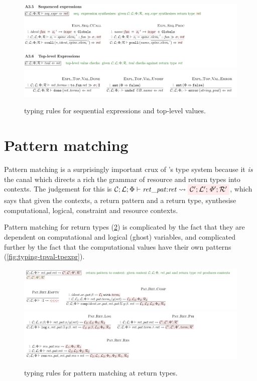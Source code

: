 \begin{figure}[tp]
    \includegraphics{figures/kernel-seq-expr-typing}
    \includegraphics{figures/kernel-tval-typing}
    \caption{ typing rules for sequential expressions and top-level values.}\label{fig:typing-seq-expr-tval}
\end{figure}

\section{Pattern matching}

Pattern matching is a surprisingly important crux of 's type
system because it \emph{is} the canal which directs a rich the grammar of
resource and return types into contexts. The judgement for this is
$\mathcal{C}; \mathcal{L}; \Phi \vdash \mathit{ret\_pat} {:} \mathit{ret}
\rightsquigarrow \outpol{\mathcal{C}'; \mathcal{L}'; \Phi'; \mathcal{R}'}$,
which says that given the contexts, a return pattern and a return type,
synthesise computational, logical, constraint and resource contexts.

Pattern matching for return types (\cref{fig:typing-ret-pat}) is complicated by
the fact that they are dependent on computational and logical (ghost)
variables, and complicated further by the fact that the computational values
have their own patterns (\cref{fig:typing-tpval-tpexpr}).

\begin{figure}[tp]
    \includegraphics{figures/kernel-ret-pat-typing-1}
    \includegraphics{figures/kernel-ret-pat-typing-2}
    \caption{ typing rules for pattern matching at return
        types.}\label{fig:typing-ret-pat}
\end{figure}

